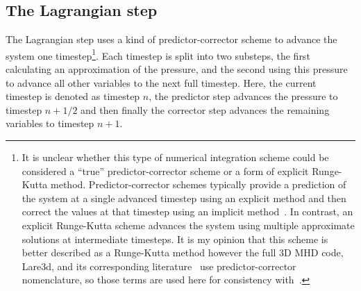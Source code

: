 \subsection{The Lagrangian step}
The Lagrangian step uses a kind of predictor-corrector scheme to advance the system one timestep\footnote{It is unclear whether this type of numerical integration scheme could be considered a ``true'' predictor-corrector scheme or a form of explicit Runge-Kutta method. Predictor-corrector schemes typically provide a prediction of the system at a single advanced timestep using an explicit method and then correct the values at that timestep using an implicit method~\cite{butcherNumericalMethodsOrdinary2004}. In contrast, an explicit Runge-Kutta scheme advances the system using multiple approximate solutions at intermediate timesteps. It is my opinion that this scheme is better described as a Runge-Kutta method however the full 3D MHD code, Lare3d, and its corresponding literature~\cite{arberStaggeredGridLagrangian2001} use predictor-corrector nomenclature, so those terms are used here for consistency with~\cite{arberStaggeredGridLagrangian2001}.}. Each timestep is split into two substeps, the first calculating an approximation of the pressure, and the second using this pressure to advance all other variables to the next full timestep. Here, the current timestep is denoted as timestep $n$, the predictor step advances the pressure to timestep $n+1/2$ and then finally the corrector step advances the remaining variables to timestep $n+1$.

